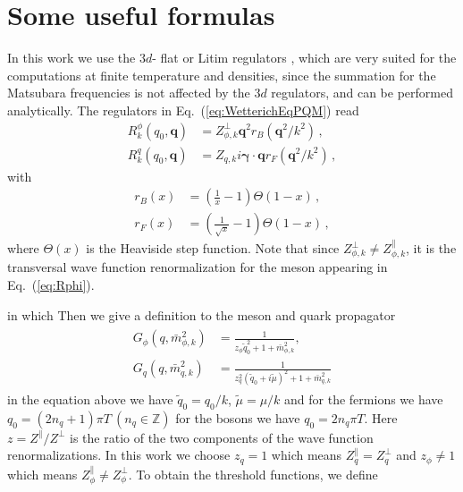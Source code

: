\documentclass[%
reprint,
superscriptaddress,
showpacs,preprintnumbers,
 amsmath,amssymb,
 aps,
prd,
]{revtex4-1}
\def\Eq#1{Eq.~(\ref{#1})}
\begin{document}
\appendix

\section{Some useful formulas}
\label{app:formula}

In this work we use the $3d$- flat or Litim regulators \cite{Litim:2000ci,Litim:2001up}, which are very suited for the computations at finite temperature and densities, since the summation for the Matsubara frequencies is not affected by the $3d$ regulators, and can be performed analytically. The regulators in \Eq{eq:WetterichEqPQM} read
\begin{align}
  R^{\phi}_{k}(q_0,\bm{q})&=Z^{\perp}_{\phi,k}\bm{q}^2 r_B(\bm{q}^2/k^2)\,, \label{eq:Rphi}\\[2ex] 
  R^{q}_{k}(q_0,\bm{q})&=Z_{q,k}i\bm{\gamma} \cdot \bm{q} r_F(\bm{q}^2/k^2)\,, \label{eq:Rq}
\end{align} 
with 
\begin{align}
  r_B(x)&=\left( \frac{1}{x}-1 \right)\Theta(1-x)\,,\\[2ex] 
  r_F(x)&=\left( \frac{1}{\sqrt{x}}-1 \right)\Theta(1-x)\,,  \label{}
\end{align} 
where $\Theta(x)$ is the Heaviside step function. Note that since $Z^{\perp}_{\phi,k}\neq Z^{\parallel}_{\phi,k}$, it is  the transversal wave function renormalization for the meson appearing in \Eq{eq:Rphi}.


















in which
Then we give a definition to the meson and quark propagator
\begin{align}
\begin{split}
G_\phi(q,\bar{m}^{2}_{\phi,k})&=\frac{1}{z_\phi\tilde{q}^{2}_{0}+1+\bar{m}^{2}_{\phi,k}} ,\\
G_q(q,\bar{m}^{2}_{q,k})&=\frac{1}{z^{2}_{q}(\tilde{q}_0+i\tilde{\mu})^2+1+\bar{m}^{2}_{q,k}}
\end{split}
\end{align} 
in the equation above we have $\tilde{q}_0=q_0/k$, $\tilde{\mu}=\mu/k$ and for the fermions we have
$q_0=(2n_q+1)\pi T \ (n_q\in \mathbb{Z})$ for the bosons we have $q_0=2n_q\pi T$. Here $z=Z^\|/Z^\bot$ is the ratio of the 
two components of the wave function renormalizations. In this work we choose $z_q=1$ which means $Z^{\|}_{q}=
Z^{\bot}_{q}$ and $z_\phi\neq 1$ which means $Z^{\|}_{\phi}\neq Z^{\bot}_{\phi}$. To obtain the threshold functions, we 
define
\end{document}
